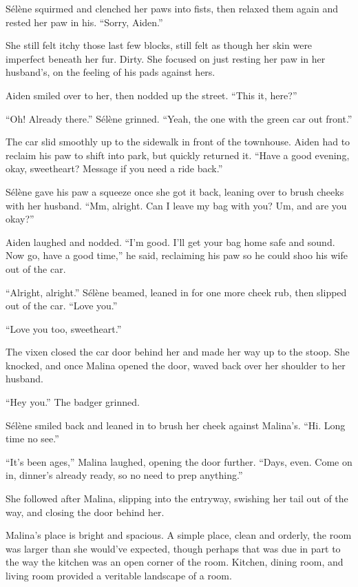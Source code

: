 Sélène squirmed and clenched her paws into fists, then relaxed them again and rested her paw in his. ``Sorry, Aiden.''

She still felt itchy those last few blocks, still felt as though her skin were imperfect beneath her fur. Dirty. She focused on just resting her paw in her husband's, on the feeling of his pads against hers.

Aiden smiled over to her, then nodded up the street. ``This it, here?''

``Oh! Already there.'' Sélène grinned. ``Yeah, the one with the green car out front.''

The car slid smoothly up to the sidewalk in front of the townhouse. Aiden had to reclaim his paw to shift into park, but quickly returned it. ``Have a good evening, okay, sweetheart? Message if you need a ride back.''

Sélène gave his paw a squeeze once she got it back, leaning over to brush cheeks with her husband. ``Mm, alright. Can I leave my bag with you? Um, and are you okay?''

Aiden laughed and nodded. ``I'm good. I'll get your bag home safe and sound. Now go, have a good time,'' he said, reclaiming his paw so he could shoo his wife out of the car.

``Alright, alright.'' Sélène beamed, leaned in for one more cheek rub, then slipped out of the car. ``Love you.''

``Love you too, sweetheart.''

The vixen closed the car door behind her and made her way up to the stoop. She knocked, and once Malina opened the door, waved back over her shoulder to her husband.

``Hey you.'' The badger grinned.

Sélène smiled back and leaned in to brush her cheek against Malina's. ``Hi. Long time no see.''

``It's been ages,'' Malina laughed, opening the door further. ``Days, even. Come on in, dinner's already ready, so no need to prep anything.''

She followed after Malina, slipping into the entryway, swishing her tail out of the way, and closing the door behind her.

Malina's place is bright and spacious. A simple place, clean and orderly, the room was larger than she would've expected, though perhaps that was due in part to the way the kitchen was an open corner of the room. Kitchen, dining room, and living room provided a veritable landscape of a room.

